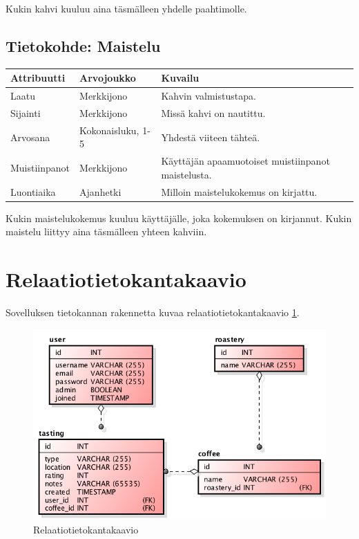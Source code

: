 \documentclass[a4paper,titlepage]{article}
\begin{document}
Kukin kahvi kuuluu aina täsmälleen yhdelle paahtimolle.

\subsection{Tietokohde: Maistelu}

\begin{center}
\begin{tabularx}{\textwidth}{ |X|X|X| }
\hline
Attribuutti & Arvojoukko & Kuvailu \\
\hline
Laatu & Merkkijono & Kahvin valmistustapa. \\
Sijainti & Merkkijono & Missä kahvi on nautittu. \\
Arvosana & Kokonaisluku, 1-5 & Yhdestä viiteen tähteä. \\
Muistiinpanot & Merkkijono & Käyttäjän apaamuotoiset muistiinpanot maistelusta. \\
Luontiaika & Ajanhetki & Milloin maistelukokemus on kirjattu. \\
\hline
\end{tabularx}
\end{center}

Kukin maistelukokemus kuuluu käyttäjälle, joka kokemuksen on
kirjannut. Kukin maistelu liittyy aina täsmälleen yhteen kahviin.


\section{Relaatiotietokantakaavio}

Sovelluksen tietokannan rakennetta kuvaa relaatiotietokantakaavio
\ref{fig:relaatiotietokantakaavio}.

\begin{figure}[ht]
  \includegraphics[width=12cm]{relational}
  \caption{Relaatiotietokantakaavio}
  \label{fig:relaatiotietokantakaavio}
\end{figure}
\end{document}
